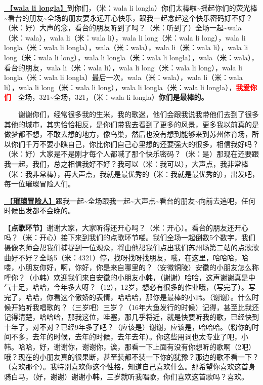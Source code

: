 \documentclass[]{ctexbook}
\begin{document}
\hyperref[wala-li-longla]{🎵【\textbf{wala li longla}】}到你们，（米：wala li longla）你们太棒啦\textasciitilde 摇起你们的荧光棒\textasciitilde 看台的朋友\textasciitilde 全场的朋友要永远开心快乐，跟我一起念起这个快乐密码好不好？（米：好）大声的念，看台的朋友听到了吗？（米：听到了）全场一起\textasciitilde wala（米：wala），wala li（米：wala li），wala li long（米：wala li long），wala li longla（米：wala li longla），wala（米：wala），wala li（米：wala li），wala li long（米：wala li long），wala li longla（米：wala li longla），wala（米：wala），看台的朋友，wala li（米：wala li），wala li long（米：wala li long），wala li longla（米：wala li longla）最后一次，wala（米：wala），wala li（米：wala li），wala li long（米：wala li long），wala li longla（米：wala li longla），\textbf{\textcolor{red}{我爱你们~ } }全场，321\textasciitilde 全场，321，（米：wala li longla）\textbf{你们是最棒的。}

  谢谢你们，经常很多我的生米，我的歌迷，他们会跟我说我带他们去到了很多其他的城市，其实恰恰相反，是你们带我去看到了更多的风景，更多我以前真的是做梦都不想，不敢去想的地方，像鸟巢，然后也没有想到能够来到苏州体育场，所以你们千万不要小瞧自己，你比你们自己心里想的还要强大的很多，相信我好吗？（米：好）大家是不是刚才每个人都喊了那个快乐密码？（米：是）那现在还要跟我一起，我们，总之相信我好不好？我可以（米：我可以），大声点，我非常棒（米：我非常棒），再大声点，我就是最优秀的（米：我就是最优秀的），出发吧，每一位璀璨冒险人们。

\hyperref[adventurers]{🎵【\textbf{璀璨冒险人}】}跟我一起\textasciitilde 全场跟我一起\textasciitilde 大声点\textasciitilde 看台的朋友\textasciitilde 向前去追吧，任何时候出发都不会晚的。

【\textbf{点歌环节}】谢谢大家，大家听得还开心吗？（米：开心）。看台的朋友还开心吗？（米：开心）接下来到我们的点歌环节喽。我们全场一起倒数5个数字，我们摄像老师会帮我们捕捉到一位观众，将由他帮我们点出我们苏州场第二站的点歌歌曲好不好？全场5（米：4321）停，找呀找呀找朋友，哦，在这里，哈哈哈，哈喽，小朋友你好，啊，你好，你是来自哪里的？（安徽铜陵）安徽的小朋友怎么称呼你？（小韩）欢迎我们来自安徽的小朋友小韩，（谢谢）哈哈，这声谢谢真是中气十足，哈哈，今年多大呀？（12），12岁，想必有很多的作业哦，（写完了）。写完了，哈哈，你看这个傲娇的表情，哈哈哈，那你是最棒的小韩。（谢谢）。什么时候开始听我唱歌的？（三岁吧）三岁？（16年大鱼发行的时候）记得，甚至比我还记得清楚，哈哈哈，那我这位，哇塞，那几乎将近，就是快要听我的歌，已经快到十年了，对不对？已经9年多了吧？（应该是）谢谢，应该是，哈哈哈。（粉你的时间不多，去年的时候，去年的时候，去年去年）。你这些用词也太专业了吧，小韩。哈哈，好，谢谢你，谢谢你，诶，那看一下上面有没有你想听的歌啊（2吧）哦？现在的小朋友真的很果断，甚至装都不装一下你的犹豫？那边的歌不看一下？（喜欢那个）。我特别喜欢你这个性格，知道自己喜欢什么。那希望你喜欢这首身骑白马，（好，谢谢）谢谢小韩，三岁就听我唱歌，你们喜欢这首歌吗？喜欢。
\end{document}

